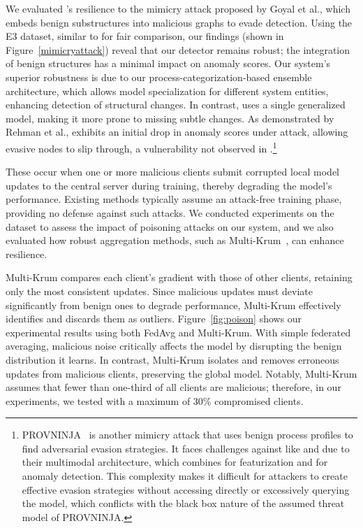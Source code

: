   We evaluated \Sys’s resilience to the mimicry attack proposed by Goyal et al.\cite{goyal2023sometimes}, which embeds benign substructures into malicious graphs to evade detection. Using the E3 dataset, similar to \flash for fair comparison, our findings (shown in Figure~\ref{mimicryattack}) reveal that our detector remains robust; the integration of benign structures has a minimal impact on anomaly scores. Our system's superior robustness is due to our process-categorization-based ensemble \gnnshort architecture, which allows model specialization for different system entities, enhancing detection of structural changes. In contrast, \flash uses a single generalized model, making it more prone to missing subtle changes. As demonstrated by Rehman et al., \flash exhibits an initial drop in anomaly scores under attack, allowing evasive nodes to slip through, a vulnerability not observed in \Sys.\footnote{PROVNINJA~\cite{mukherjee2023evading} is another mimicry attack that uses benign process profiles to find adversarial evasion strategies. It faces challenges against \pids like \flash and \Sys due to their multimodal architecture, which combines \wordvec for featurization and \gnnshort for anomaly detection. This complexity makes it difficult for attackers to create effective evasion strategies without accessing \wordvec directly or excessively querying the model, which conflicts with the black box nature of the assumed threat model of PROVNINJA.}


 These occur when one or more malicious clients submit corrupted local model updates to the central server during training, thereby degrading the model’s performance. Existing methods typically assume an attack-free training phase, providing no defense against such attacks. We conducted experiments on the \optc dataset to assess the impact of poisoning attacks on our system, and we also evaluated how robust aggregation methods, such as Multi-Krum~\cite{munoz2019byzantine}, can enhance resilience.

Multi-Krum compares each client’s gradient with those of other clients, retaining only the most consistent updates. Since malicious updates must deviate significantly from benign ones to degrade performance, Multi-Krum effectively identifies and discards them as outliers. Figure~\ref{fig:poison} shows our experimental results using both FedAvg and Multi-Krum. With simple federated averaging, malicious noise critically affects the model by disrupting the benign distribution it learns. In contrast, Multi-Krum isolates and removes erroneous updates from malicious clients, preserving the global model. Notably, Multi-Krum assumes that fewer than one-third of all clients are malicious; therefore, in our experiments, we tested with a maximum of 30\% compromised clients.



